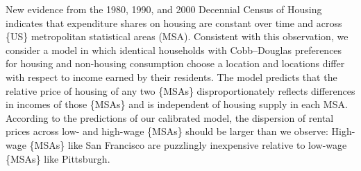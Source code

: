 New evidence from the 1980, 1990, and 2000 Decennial Census of Housing indicates that expenditure shares on housing are constant over time and across \{US\} metropolitan statistical areas (MSA). Consistent with this observation, we consider a model in which identical households with Cobb–Douglas preferences for housing and non-housing consumption choose a location and locations differ with respect to income earned by their residents. The model predicts that the relative price of housing of any two \{MSAs\} disproportionately reflects differences in incomes of those \{MSAs\} and is independent of housing supply in each MSA. According to the predictions of our calibrated model, the dispersion of rental prices across low- and high-wage \{MSAs\} should be larger than we observe: High-wage \{MSAs\} like San Francisco are puzzlingly inexpensive relative to low-wage \{MSAs\} like Pittsburgh.